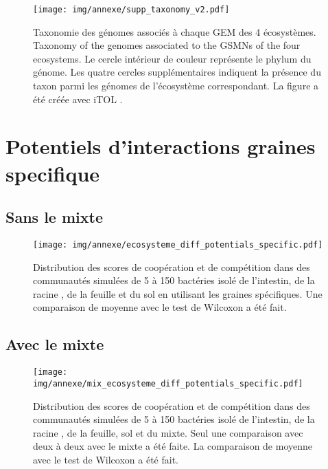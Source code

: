\documentclass[../main.tex]{subfiles}
\begin{document}
\begin{figure*}[p]
    \centering
    \texttt{[image: img/annexe/supp\_taxonomy\_v2.pdf]}
    \caption{Taxonomie des génomes associés à chaque GEM des 4 écosystèmes. Taxonomy of the genomes associated to the GSMNs of the four ecosystems. Le cercle intérieur de couleur représente le phylum du génome. Les quatre cercles supplémentaires indiquent la présence du taxon parmi les génomes de l'écosystème correspondant. La figure a été créée avec iTOL \citep{Letunic2007}.}
    \label{supp:taxo}
\end{figure*}

\newpage
\section*{Potentiels d'interactions graines specifique}

\subsection*{Sans le mixte}

\begin{figure}[H]
    \centering
    \texttt{[image: img/annexe/ecosysteme\_diff\_potentials\_specific.pdf]}
    \caption{Distribution des scores de coopération et de compétition dans des communautés simulées de 5 à 150 bactéries isolé de l'intestin, de la racine , de la feuille et du sol en utilisant les graines spécifiques. Une comparaison de moyenne avec le test de Wilcoxon a été fait. }
    \label{fig:mix-diff-potentials}
\end{figure}

\newpage

\subsection*{Avec le mixte}

\begin{figure}[H]
    \centering
    \texttt{[image: img/annexe/mix\_ecosysteme\_diff\_potentials\_specific.pdf]}
    \caption{Distribution des scores de coopération et de compétition dans des communautés simulées de 5 à 150 bactéries isolé de l'intestin, de la racine , de la feuille, sol et du mixte. Seul une comparaison avec deux à deux avec le mixte a été faite. La comparaison de moyenne avec le test de Wilcoxon a été fait. }
    \label{fig:mix-diff-potentials}
\end{figure}
\end{document}
